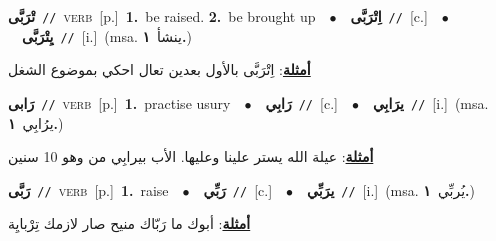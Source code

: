 \documentclass[10pt,a4paper,twoside]{article} %
\begin{document}
\begin{multicols}{2}
{\setlength\topsep{0pt}\textbf{\foreignlanguage{arabic}{تْرَبَّى}}\ {\color{gray}\texttt{//}\color{black}}\ \textsc{verb}\ [p.]\ \textbf{1.}~be raised.  \textbf{2.}~be brought up\ \ $\bullet$\ \ \setlength\topsep{0pt}\textbf{\foreignlanguage{arabic}{اِتْرَبَّى}}\ {\color{gray}\texttt{//}\color{black}}\ [c.]\ \ $\bullet$\ \ \setlength\topsep{0pt}\textbf{\foreignlanguage{arabic}{يِتْرَبَّى}}\ {\color{gray}\texttt{//}\color{black}}\ [i.]\ \color{gray}(msa. \foreignlanguage{arabic}{ينشأ}~\foreignlanguage{arabic}{\textbf{١.}})\color{black}\  \begin{flushright}\color{gray}\foreignlanguage{arabic}{\textbf{\underline{\foreignlanguage{arabic}{أمثلة}}}: اِتْرَبَّى بالأول بعدين تعال احكي بموضوع الشغل}\end{flushright}\color{black}} \vspace{2mm}

{\setlength\topsep{0pt}\textbf{\foreignlanguage{arabic}{رَابى}}\ {\color{gray}\texttt{//}\color{black}}\ \textsc{verb}\ [p.]\ \textbf{1.}~practise usury\ \ $\bullet$\ \ \setlength\topsep{0pt}\textbf{\foreignlanguage{arabic}{رَابِي}}\ {\color{gray}\texttt{//}\color{black}}\ [c.]\ \ $\bullet$\ \ \setlength\topsep{0pt}\textbf{\foreignlanguage{arabic}{يرَابِي}}\ {\color{gray}\texttt{//}\color{black}}\ [i.]\ \color{gray}(msa. \foreignlanguage{arabic}{يرُابِي}~\foreignlanguage{arabic}{\textbf{١.}})\color{black}\  \begin{flushright}\color{gray}\foreignlanguage{arabic}{\textbf{\underline{\foreignlanguage{arabic}{أمثلة}}}: عيلة الله يستر علينا وعليها. الأب بيرابِي من وهو 10 سنين}\end{flushright}\color{black}} \vspace{2mm}

{\setlength\topsep{0pt}\textbf{\foreignlanguage{arabic}{رَبَّى}}\ {\color{gray}\texttt{//}\color{black}}\ \textsc{verb}\ [p.]\ \textbf{1.}~raise\ \ $\bullet$\ \ \setlength\topsep{0pt}\textbf{\foreignlanguage{arabic}{رَبِّي}}\ {\color{gray}\texttt{//}\color{black}}\ [c.]\ \ $\bullet$\ \ \setlength\topsep{0pt}\textbf{\foreignlanguage{arabic}{يرَبِّي}}\ {\color{gray}\texttt{//}\color{black}}\ [i.]\ \color{gray}(msa. \foreignlanguage{arabic}{يُربِّي}~\foreignlanguage{arabic}{\textbf{١.}})\color{black}\  \begin{flushright}\color{gray}\foreignlanguage{arabic}{\textbf{\underline{\foreignlanguage{arabic}{أمثلة}}}: أبوك ما رَبّاك منيح صار لازمك تِرْبايِة}\end{flushright}\color{black}} \vspace{2mm}


\end{multicols}
\end{document}
